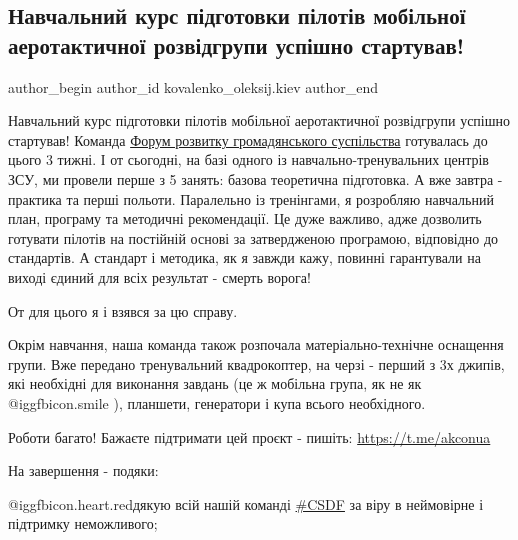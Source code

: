  
 
 
 
 
 
\subsection{Навчальний курс підготовки пілотів мобільної аеротактичної розвідгрупи успішно стартував!}
\label{sec:17_05_2022.fb.kovalenko_oleksij.kiev.1.kurs_piloty}
 
\ifcmt
 author_begin
   author_id kovalenko_oleksij.kiev
 author_end
\fi

Навчальний курс підготовки пілотів мобільної аеротактичної розвідгрупи успішно
стартував! Команда \href{https://www.facebook.com/csdf.ua}{Форум розвитку
громадянського суспільства} готувалась до цього 3 тижні. І от сьогодні, на базі
одного із навчально-тренувальних центрів ЗСУ, ми провели перше з 5 занять:
базова теоретична підготовка. А вже завтра - практика та перші польоти.
Паралельно із тренінгами, я розробляю навчальний план, програму та методичні
рекомендації. Це дуже важливо, адже дозволить готувати пілотів на постійній
основі за затвердженою програмою, відповідно до стандартів. А стандарт і
методика, як я завжди кажу, повинні гарантували на виході єдиний для всіх
результат - смерть ворога!


От для цього я і взявся за цю справу.

Окрім навчання, наша команда також розпочала матеріально-технічне оснащення
групи. Вже передано тренувальний квадрокоптер, на черзі - перший з 3х джипів,
які необхідні для виконання завдань (це ж мобільна група, як не як  @igg{fbicon.smile}  ),
планшети, генератори і купа всього необхідного.

Роботи багато! Бажаєте підтримати цей проєкт - пишіть: \url{https://t.me/akconua}

На завершення - подяки:

@igg{fbicon.heart.red}дякую всій нашій команді
\href{https://www.facebook.com/hashtag/csdf}{\#CSDF} за віру в неймовірне і
підтримку неможливого;

